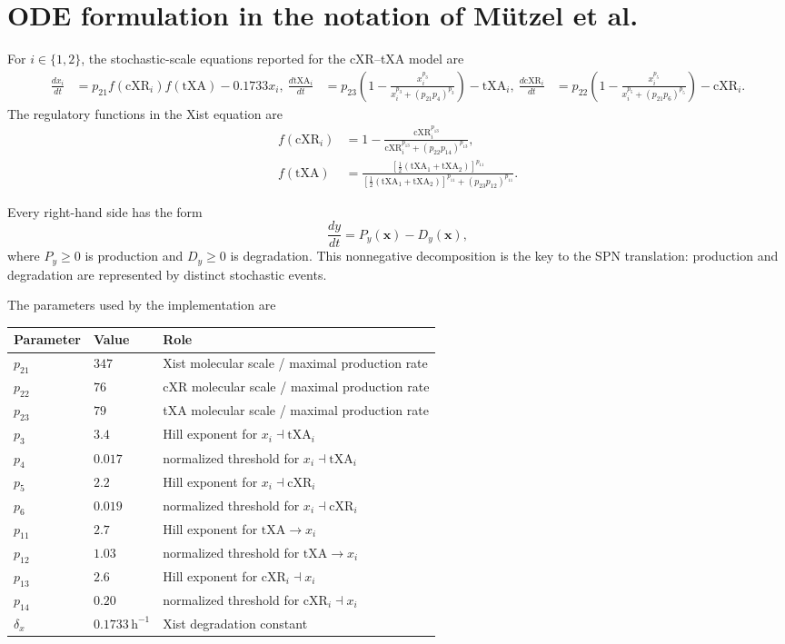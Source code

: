 \documentclass[11pt,a4paper]{article}
\newcommand{\txa}{\mathrm{tXA}}
\newcommand{\cxr}{\mathrm{cXR}}
\begin{document}
\section{ODE formulation in the notation of M\"utzel et al.}

For $i\in\{1,2\}$, the stochastic-scale equations reported for the cXR--tXA
model are \cite{mutzel2019supp}
\begin{align}
  \frac{dx_i}{dt}
    &=p_{21}f(\cxr_i)f(\txa)-0.1733x_i, \label{eq:xist}\
  \frac{d\txa_i}{dt}
    &=p_{23}\left(1-
      \frac{x_i^{p_3}}{x_i^{p_3}+(p_{21}p_4)^{p_3}}\right)-\txa_i,
      \label{eq:txa}\
  \frac{d\cxr_i}{dt}
    &=p_{22}\left(1-
      \frac{x_i^{p_5}}{x_i^{p_5}+(p_{21}p_6)^{p_5}}\right)-\cxr_i.
      \label{eq:cxr}
\end{align}
The regulatory functions in the Xist equation are
\begin{align}
 f(\cxr_i)
   &=1-\frac{\cxr_i^{p_{13}}}
      {\cxr_i^{p_{13}}+(p_{22}p_{14})^{p_{13}}}, \label{eq:fcxr}\\
 f(\txa)
   &=\frac{\left[\tfrac12(\txa_1+\txa_2)\right]^{p_{11}}}
      {\left[\tfrac12(\txa_1+\txa_2)\right]^{p_{11}}
       +(p_{23}p_{12})^{p_{11}}}. \label{eq:ftxa}
\end{align}

Every right-hand side has the form
\[
  \frac{dy}{dt}=P_y(\boldsymbol{x})-D_y(\boldsymbol{x}),
\]
where $P_y\geq0$ is production and $D_y\geq0$ is degradation.  This
nonnegative decomposition is the key to the SPN translation: production and
degradation are represented by distinct stochastic events.

The parameters used by the implementation are
\begin{center}
\begin{tabular}{@{}lll@{}}
\toprule
Parameter & Value & Role \\
\midrule
$p_{21}$ & $347$ & Xist molecular scale / maximal production rate \\
$p_{22}$ & $76$  & cXR molecular scale / maximal production rate \\
$p_{23}$ & $79$  & tXA molecular scale / maximal production rate \\
$p_3$    & $3.4$ & Hill exponent for $x_i\dashv\txa_i$ \\
$p_4$    & $0.017$ & normalized threshold for $x_i\dashv\txa_i$ \\
$p_5$    & $2.2$ & Hill exponent for $x_i\dashv\cxr_i$ \\
$p_6$    & $0.019$ & normalized threshold for $x_i\dashv\cxr_i$ \\
$p_{11}$ & $2.7$ & Hill exponent for $\txa\rightarrow x_i$ \\
$p_{12}$ & $1.03$ & normalized threshold for $\txa\rightarrow x_i$ \\
$p_{13}$ & $2.6$ & Hill exponent for $\cxr_i\dashv x_i$ \\
$p_{14}$ & $0.20$ & normalized threshold for $\cxr_i\dashv x_i$ \\
$\delta_x$ & $0.1733\,\mathrm{h}^{-1}$ & Xist degradation constant \\
\bottomrule
\end{tabular}
\end{center}
\end{document}
